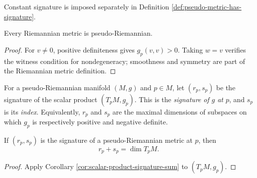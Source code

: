 Constant signature is imposed separately in Definition
\ref{def:pseudo-metric-has-signature}.

\begin{proposition}
\label{prop:riemannian-is-pseudo-riemannian}
\leanok
{}
Every Riemannian metric is pseudo-Riemannian.
\end{proposition}

\begin{proof}
\leanok
{}
\sketch For $v\ne0$, positive definiteness gives $g_p(v,v)>0$. Taking $w=v$
verifies the witness condition for nondegeneracy; smoothness and symmetry are part
of the Riemannian metric definition.
\end{proof}

\begin{definition}
\label{def:pseudo-metric-signature-at}
\leanok
{}
For a pseudo-Riemannian manifold $(M,g)$ and $p\in M$, let $(r_p,s_p)$ be the
signature of the scalar product $(T_pM,g_p)$. This is the \emph{signature of $g$
at $p$}, and $s_p$ is its \emph{index}. Equivalently, $r_p$ and $s_p$ are the
maximal dimensions of subspaces on which $g_p$ is respectively positive and
negative definite.
\end{definition}

\begin{proposition}
\label{prop:pseudo-metric-signature-sum}
\leanok
{}
If $(r_p,s_p)$ is the signature of a pseudo-Riemannian metric at $p$, then
\[
r_p+s_p=\dim T_pM.
\]
\end{proposition}

\begin{proof}
\leanok
{}
\sketch Apply Corollary \ref{cor:scalar-product-signature-sum} to $(T_pM,g_p)$.
\end{proof}

